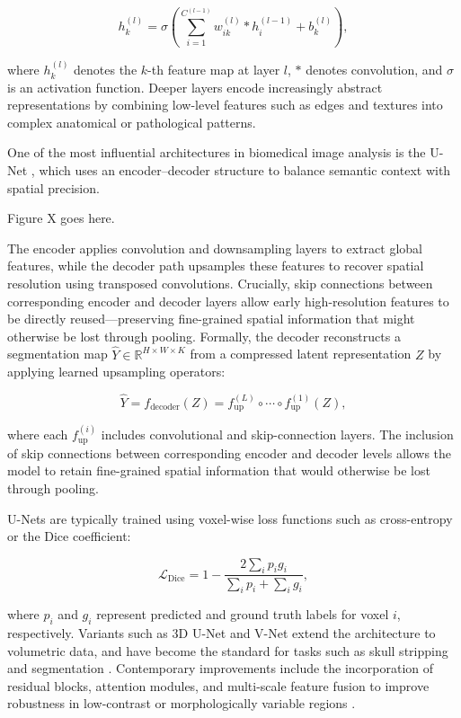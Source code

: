 \begin{equation}
    h^{(l)}_k = \sigma\left( \sum_{i=1}^{C^{(l-1)}} w^{(l)}_{ik} * h^{(l-1)}_i + b^{(l)}_k \right),
\end{equation}

where $h^{(l)}_k$ denotes the \(k\)-th feature map at layer \(l\), $*$ denotes convolution, and \(\sigma\) is an activation function. Deeper layers encode increasingly abstract representations by combining low-level features such as edges and textures into complex anatomical or pathological patterns.

One of the most influential architectures in biomedical image analysis is the U-Net \cite{Ronneberger2015-xm}, which uses an encoder–decoder structure to balance semantic context with spatial precision.

Figure X goes here. 

The encoder applies convolution and downsampling layers to extract global features, while the decoder path upsamples these features to recover spatial resolution using transposed convolutions. Crucially, skip connections between corresponding encoder and decoder layers allow early high-resolution features to be directly reused—preserving fine-grained spatial information that might otherwise be lost through pooling. Formally, the decoder reconstructs a segmentation map $\hat{Y} \in \mathbb{R}^{H \times W \times K}$ from a compressed latent representation $Z$ by applying learned upsampling operators:

\begin{equation}
    \hat{Y} = f_{\text{decoder}}(Z) = f^{(L)}_{\text{up}} \circ \cdots \circ f^{(1)}_{\text{up}}(Z),
\end{equation}

where each $f^{(i)}_{\text{up}}$ includes convolutional and skip-connection layers. The inclusion of skip connections between corresponding encoder and decoder levels allows the model to retain fine-grained spatial information that would otherwise be lost through pooling.

U-Nets are typically trained using voxel-wise loss functions such as cross-entropy or the Dice coefficient:

\begin{equation}
    \mathcal{L}_{\text{Dice}} = 1 - \frac{2 \sum_i p_i g_i}{\sum_i p_i + \sum_i g_i},
\end{equation}

where $p_i$ and $g_i$ represent predicted and ground truth labels for voxel $i$, respectively. Variants such as 3D U-Net \cite{Cicek2016-dz} and V-Net \cite{Milletari2016-ra} extend the architecture to volumetric data, and have become the standard for tasks such as skull stripping \cite{Hoopes2022-al} and segmentation \cite{Billot2023-tl, DeKraker2022-gj}. Contemporary improvements include the incorporation of residual blocks, attention modules, and multi-scale feature fusion to improve robustness in low-contrast or morphologically variable regions \cite{Oktay2018-rh}. 


